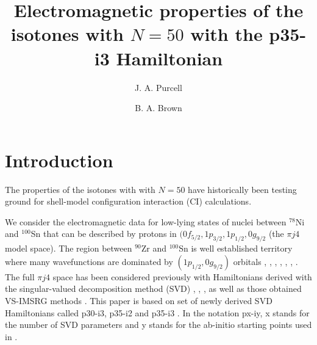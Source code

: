 \documentclass[aps,prl,twocolumn,tightenlines,superscriptaddress,showpacs]{revtex4-1}
\begin{document}
\title{Electromagnetic properties of the isotones with $  N=50  $ with the p35-i3 Hamiltonian}

\author{J. A. Purcell}
\author{B. A. Brown}




\begin{abstract}



\end{abstract}

\maketitle

\section{Introduction}

The properties of the isotones with with $  N=50  $ have historically been testing ground for
shell-model configuration interaction (CI) calculations.

We consider the electromagnetic data for low-lying states of nuclei between $^{78}$Ni and $^{100}$Sn
that can be described by protons in $  ({0f_{5/2}, 1p_{3/2}, 1p_{1/2}, 0g_{9/2}}  $
(the $  \pi j4  $ model space).
The region between $^{90}$Zr and $^{100}$Sn is well established territory where many
wavefunctions are dominated by $  (1p_{1/2}, 0g_{9/2})  $ orbitals
\cite{talmi60}, \cite{cohen64}, \cite{aurbach65}, \cite{vervier66}, \cite{ball72}, 
\cite{gloeckner73}, \cite{blomqvist85}.
The full $  \pi j4  $  space has been considered previously with Hamiltonians derived
with the singular-valued decomposition method (SVD)
\cite{jun45}, \cite{jw88}, \cite{jj44a}, as well as those obtained VS-IMSRG methods \cite{Yuan24}.
This paper is based on set of  newly derived SVD Hamiltonians called p30-i3, p35-i2 and p35-i3 
\cite{p35i3}.
In the notation px-iy, x stands for the number of SVD parameters and y stands for
the ab-initio starting points used in \cite{p35i3}.
\end{document}
